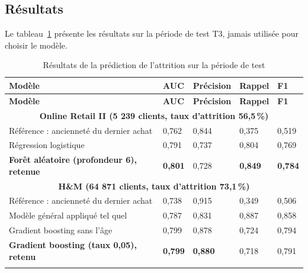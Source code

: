 \subsection{Résultats}
Le tableau~\ref{tab:resultats-churn} présente les résultats sur la période de test T3, jamais utilisée pour choisir le modèle.
\renewcommand{\arraystretch}{1.3}
\begin{longtable}{|p{5.4cm}|p{1.6cm}|p{1.8cm}|p{1.6cm}|p{1.6cm}|}
\hline
\textbf{Modèle} & \textbf{AUC} & \textbf{Précision} & \textbf{Rappel} & \textbf{F1} \\
\hline
\endfirsthead
\hline
\textbf{Modèle} & \textbf{AUC} & \textbf{Précision} & \textbf{Rappel} & \textbf{F1} \\
\hline
\endhead
\multicolumn{5}{|c|}{\textbf{Online Retail II (5 239 clients, taux d'attrition 56,5\,\%)}} \\
\hline
Référence : ancienneté du dernier achat & 0,762 & 0,844 & 0,375 & 0,519 \\
\hline
Régression logistique & 0,791 & 0,737 & 0,804 & 0,769 \\
\hline
\textbf{Forêt aléatoire (profondeur 6), retenue} & \textbf{0,801} & 0,728 & \textbf{0,849} & \textbf{0,784} \\
\hline
\multicolumn{5}{|c|}{\textbf{H\&M (64 871 clients, taux d'attrition 73,1\,\%)}} \\
\hline
Référence : ancienneté du dernier achat & 0,738 & 0,915 & 0,349 & 0,506 \\
\hline
Modèle général appliqué tel quel & 0,787 & 0,831 & 0,887 & 0,858 \\
\hline
Gradient boosting sans l'âge & 0,799 & 0,878 & 0,724 & 0,794 \\
\hline
\textbf{Gradient boosting (taux 0,05), retenu} & \textbf{0,799} & \textbf{0,880} & 0,718 & 0,791 \\
\hline
\caption{Résultats de la prédiction de l'attrition sur la période de test}
\label{tab:resultats-churn}
\end{longtable}

